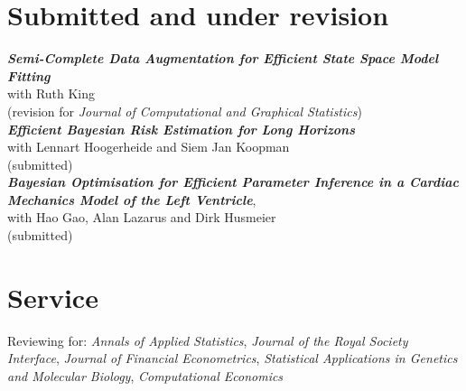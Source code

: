 \documentclass[margin,line]{resume}
\begin{document}
\begin{resume}
%
\vspace{-5mm}    
\section{\mysidestyle Submitted and under revision}	
\textit{\textbf{Semi-Complete Data Augmentation for Efficient State Space Model Fitting}}\\ 
    with Ruth King \\
    (revision for \textit{Journal of Computational and Graphical Statistics})\vspace{2mm} \\   
\textit{\textbf{Efficient Bayesian Risk Estimation for Long Horizons}}\\
	with Lennart Hoogerheide and Siem Jan Koopman\\
	(submitted)\vspace{2 mm} \\ 
\textit{\textbf{Bayesian Optimisation for Efficient Parameter Inference in a Cardiac Mechanics Model of the Left Ventricle}},\\ 
    with Hao Gao, Alan Lazarus and Dirk Husmeier \\
    (submitted) \\


      
\vspace{-5mm}
 \section{\mysidestyle Service}
Reviewing for: \textit{Annals of Applied Statistics}, \textit{Journal of the Royal Society Interface}, \textit{Journal of Financial Econometrics}, \textit{Statistical Applications in Genetics and Molecular Biology},  \textit{Computational Economics}



\end{resume}
\end{document}
